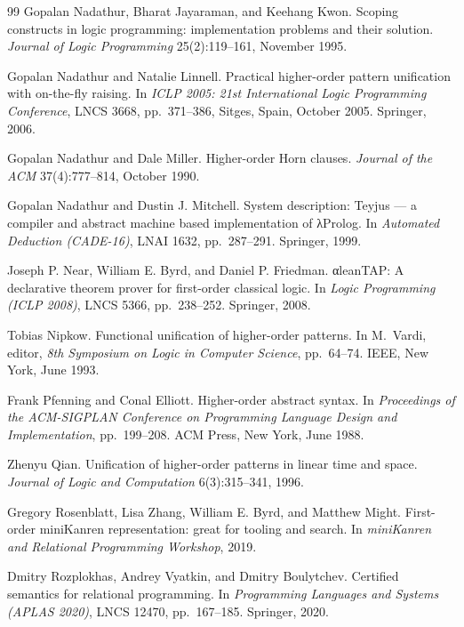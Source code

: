 \begin{thebibliography}{99}
Gopalan Nadathur, Bharat Jayaraman, and Keehang Kwon.
\newblock Scoping constructs in logic programming: implementation problems and their solution.
\newblock \emph{Journal of Logic Programming} 25(2):119--161, November 1995.

Gopalan Nadathur and Natalie Linnell.
\newblock Practical higher-order pattern unification with on-the-fly raising.
\newblock In \emph{ICLP 2005: 21st International Logic Programming Conference}, LNCS 3668, pp.~371--386,
  Sitges, Spain, October 2005. Springer, 2006.

Gopalan Nadathur and Dale Miller.
\newblock Higher-order Horn clauses.
\newblock \emph{Journal of the ACM} 37(4):777--814, October 1990.

Gopalan Nadathur and Dustin J. Mitchell.
\newblock System description: Teyjus --- a compiler and abstract machine based implementation of λProlog.
\newblock In \emph{Automated Deduction (CADE-16)}, LNAI 1632, pp.~287--291. Springer, 1999.

Joseph P. Near, William E. Byrd, and Daniel P. Friedman.
\newblock αleanTAP: A declarative theorem prover for first-order classical logic.
\newblock In \emph{Logic Programming (ICLP 2008)}, LNCS 5366, pp.~238--252. Springer, 2008.

Tobias Nipkow.
\newblock Functional unification of higher-order patterns.
\newblock In M.~Vardi, editor, \emph{8th Symposium on Logic in Computer Science}, pp.~64--74. IEEE, New
  York, June 1993.

Frank Pfenning and Conal Elliott.
\newblock Higher-order abstract syntax.
\newblock In \emph{Proceedings of the ACM-SIGPLAN Conference on Programming Language Design and
  Implementation}, pp.~199--208. ACM Press, New York, June 1988.

Zhenyu Qian.
\newblock Unification of higher-order patterns in linear time and space.
\newblock \emph{Journal of Logic and Computation} 6(3):315--341, 1996.

Gregory Rosenblatt, Lisa Zhang, William E. Byrd, and Matthew Might.
\newblock First-order miniKanren representation: great for tooling and search.
\newblock In \emph{miniKanren and Relational Programming Workshop}, 2019.

Dmitry Rozplokhas, Andrey Vyatkin, and Dmitry Boulytchev.
\newblock Certified semantics for relational programming.
\newblock In \emph{Programming Languages and Systems (APLAS 2020)}, LNCS 12470, pp.~167--185. Springer, 2020.


\end{thebibliography}
